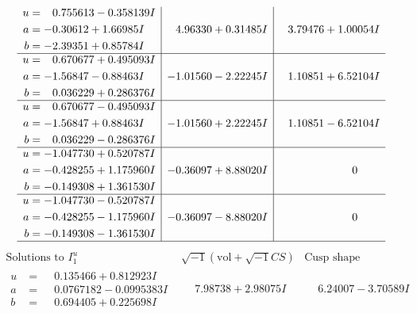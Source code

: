\documentclass[1p]{elsarticle_modified}
\theoremstyle{definition}
\newcommand{\I}{\sqrt{-1}}
\begin{document}
$$\begin{array}{c|c|c}
\begin{aligned}
u &= \phantom{-}0.755613 - 0.358139 I \\
a &= -0.30612 + 1.66985 I \\
b &= -2.39351 + 0.85784 I\end{aligned}
 & \phantom{-}4.96330 + 0.31485 I & \phantom{-}3.79476 + 1.00054 I \\ \hline\begin{aligned}
u &= \phantom{-}0.670677 + 0.495093 I \\
a &= -1.56847 - 0.88463 I \\
b &= \phantom{-}0.036229 + 0.286376 I\end{aligned}
 & -1.01560 - 2.22245 I & \phantom{-}1.10851 + 6.52104 I \\ \hline\begin{aligned}
u &= \phantom{-}0.670677 - 0.495093 I \\
a &= -1.56847 + 0.88463 I \\
b &= \phantom{-}0.036229 - 0.286376 I\end{aligned}
 & -1.01560 + 2.22245 I & \phantom{-}1.10851 - 6.52104 I \\ \hline\begin{aligned}
u &= -1.047730 + 0.520787 I \\
a &= -0.428255 + 1.175960 I \\
b &= -0.149308 + 1.361530 I\end{aligned}
 & -0.36097 + 8.88020 I & \phantom{-0.000000 } 0 \\ \hline\begin{aligned}
u &= -1.047730 - 0.520787 I \\
a &= -0.428255 - 1.175960 I \\
b &= -0.149308 - 1.361530 I\end{aligned}
 & -0.36097 - 8.88020 I & \phantom{-0.000000 } 0\\
 \hline 
 \end{array}$$\newpage$$\begin{array}{c|c|c}  
\text{Solutions to }I^u_{1}& \I (\text{vol} + \sqrt{-1}CS) & \text{Cusp shape}\\
 \hline 
\begin{aligned}
u &= \phantom{-}0.135466 + 0.812923 I \\
a &= \phantom{-}0.0767182 - 0.0995383 I \\
b &= \phantom{-}0.694405 + 0.225698 I\end{aligned}
 & \phantom{-}7.98738 + 2.98075 I & \phantom{-}6.24007 - 3.70589 I \\ \hline\begin{aligned}

\end{aligned}
\end{array}$$
\end{document}
